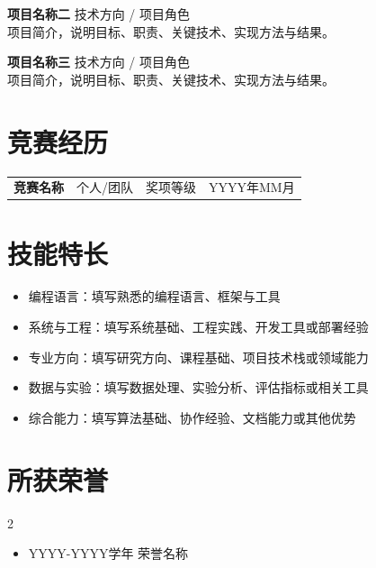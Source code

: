 \vspace{0.8em}
{\large{\textbf{项目名称二}}} \hfill {技术方向 / 项目角色}\\
项目简介，说明目标、职责、关键技术、实现方法与结果。

\vspace{0.8em}
{\large{\textbf{项目名称三}}} \hfill {技术方向 / 项目角色}\\
项目简介，说明目标、职责、关键技术、实现方法与结果。

\section{\makebox[\widthof{\faTrophy}][c]{\color{HIT_Blue}{\faTrophy}}\quad 竞赛经历}
\vspace{-1em}
\begin{table}[h!]
    \begin{tabularx}{\textwidth}{Xp{}p{}p{}}
        \textbf{竞赛名称} & 个人/团队 & 奖项等级 & YYYY年MM月 \\
    \end{tabularx}
\end{table}

\section{\makebox[\widthof{\faWrench}][c]{\color{HIT_Blue}{\faWrench}}\quad 技能特长}
\vspace{0.5em}
\begin{itemize}
    \item 编程语言：填写熟悉的编程语言、框架与工具
    \item 系统与工程：填写系统基础、工程实践、开发工具或部署经验
    \item 专业方向：填写研究方向、课程基础、项目技术栈或领域能力
    \item 数据与实验：填写数据处理、实验分析、评估指标或相关工具
    \item 综合能力：填写算法基础、协作经验、文档能力或其他优势
\end{itemize}

\section{\makebox[\widthof{\faStar}][c]{\color{HIT_Blue}{\faStar}}\quad 所获荣誉}
\vspace{-1em}
\begin{multicols}{2}
    \begin{itemize}
        \item YYYY-YYYY学年 荣誉名称
    \end{itemize}
\end{multicols}


